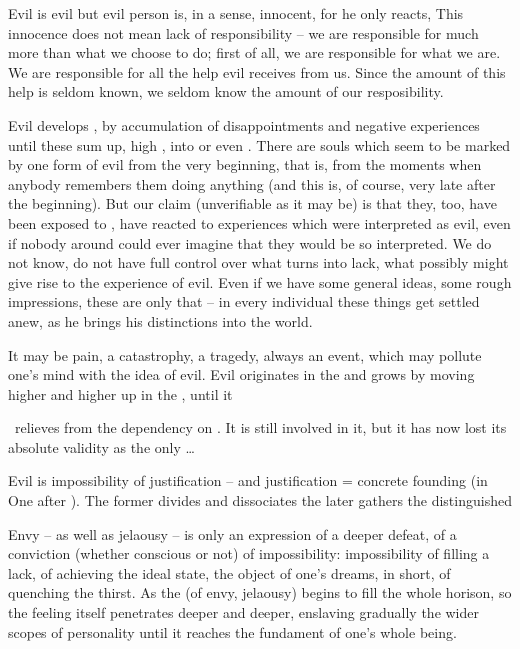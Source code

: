 Evil is evil but evil person is, in a sense, innocent, for he only reacts, 
 This innocence does not mean lack of responsibility -- we are
responsible for much more than what we choose to do; first of all, we are
responsible for what we are. We are responsible for all the help evil receives
from us. Since the amount of this help is seldom known, we seldom know the
amount of our resposibility. 

 Evil develops 
, by accumulation of disappointments and negative experiences
until these sum up, high , into  or even
.
There are souls which seem to be marked by one
form of evil from the very beginning, that is, from the moments when anybody
remembers them doing anything (and this is, of course, very late after the
beginning).  But our claim (unverifiable as it may be) is that they, too, have
been exposed to , have reacted to experiences which were
interpreted as evil, even if nobody around could ever imagine that they
would be so interpreted. We do not know, do not have full control over what
turns  into lack, what possibly might give rise to the experience of
evil. Even if we have some general ideas, some rough impressions, these are only
that -- in every individual these things get settled anew, as he brings his
distinctions into the world. 

It may be pain, a catastrophy, a tragedy, always an  event, which may
pollute one's mind with the idea of evil. Evil originates in the 
and grows by moving higher and higher up in the , until it 




\pa
\yes\ relieves  from the dependency on . 
It is still involved in it, but it has now lost its absolute validity 
as the only \ldots


Evil is impossibility of justification -- and 
justification = concrete founding (in One after \yes). The former divides and
dissociates the later gathers the distinguished

Envy -- as well as jelaousy -- is only an  expression of a deeper
defeat, of a conviction (whether conscious or not) of impossibility:
impossibility of filling a lack, of achieving the ideal state, the object of
one's dreams, in short, of quenching the {thirst}. As the  (of
envy, jelaousy) begins to fill the whole horison, so the feeling itself
penetrates deeper and deeper, enslaving gradually the wider scopes of
personality until it reaches the fundament of one's whole being.

